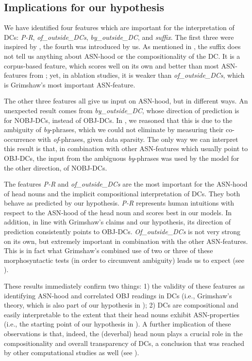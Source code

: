 \documentclass[output=paper]{langsci/langscibook}
\begin{document}
\subsection{Implications for our hypothesis}\label{sec:gia:discussion-hypothesis}


We have identified four features which are important for the interpretation of DCs: \textit{P-R}, \textit{of\_outside\_DCs}, \textit{by\_outside\_DC}, and \textit{suffix}. The first three were inspired by \cite{grimshaw:90}, the fourth was introduced by us. As mentioned in , the suffix does not tell us anything about ASN-hood or the compositionality of the DC. It is a corpus-based feature, which scores well on its own and better than most ASN-features from \cite{grimshaw:90}; yet, in ablation studies, it is weaker than \textit{of\_outside\_DCs}, which is Grimshaw's most important ASN-feature.

The other three features all give us input on ASN-hood, but in different ways. An unexpected result comes from \textit{by\_outside\_DC}, whose direction of prediction is for NOBJ-DCs, instead of OBJ-DCs. In , we reasoned that this is due to the ambiguity of \textit{by}-phrases, which we could not eliminate by measuring their co-occurrence with \textit{of}-phrases, given data sparsity. The only way we can interpret this result is that, in combination with other ASN-features which usually point to OBJ-DCs, the input from the ambiguous \textit{by}-phrases was used by the model for the other direction, of NOBJ-DCs.

The features \textit{P-R} and \textit{of\_outside\_DCs} are the most important for the ASN-hood of head nouns and the implicit compositional interpretation of DCs. They both behave as predicted by our hypothesis. \textit{P-R} represents human intuitions with respect to the ASN-hood of the head noun and scores best in our models. In addition, in line with Grimshaw's claims and our hypothesis, its direction of prediction consistently points to OBJ-DCs. \textit{Of\_outside\_DCs} is not very strong on its own, but extremely important in combination with the other ASN-features. This is in fact what Grimshaw's combined use of two or three of these morphosyntactic tests (in order to circumvent ambiguity) leads us to expect (see ).

These results immediately confirm two things: 1) the validity of these features as identifying ASN-hood and correlated OBJ readings in DCs (i.e., Grimshaw's theory, which is also part of our hypothesis in ); 2) DCs are compositional and easily interpretable to the extent that their head nouns exhibit ASN-properties (i.e., the starting point of our hypothesis in ). A further implication of these observations is that, indeed, the (deverbal) head noun  plays a crucial role in the compositionality  {and overall} transparency of DCs, a conclusion that was reached by other computational studies as well (see ). 
\end{document}
